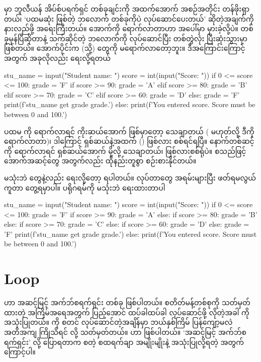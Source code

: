   မှာ ဘူလီယန် အိပ်စ်ပရက်ရှင် တစ်ခုချင်းကို အထက်အောက် အစဉ်အတိုင်း တန်ဖိုးရှာတယ်၊ ‘ပထမဆုံး   ဖြစ်တဲ့ ဘလောက် တစ်ခုကိုပဲ လုပ်ဆောင်ပေးတယ်’ ဆိုတဲ့အချက်ကို နားလည်ဖို့ အရေးကြီးတယ်။ အောက်ကို ရောက်လာတာဟာ အပေါ်မှာ မှားခဲ့လို့ပဲ။ တစ်ခုမှန်ပြီဆိုတာနဲ့ သက်ဆိုင်တဲ့ ဘလောက်ကို လုပ်ဆောင်ပြီး   တစ်တွဲလုံး ပြီးဆုံးသွားမှာ ဖြစ်တယ်။ အောက်ပိုင်းက  (သို့)  တွေကို မရောက်လာတော့ဘူး။ ဒီအကြောင်းကြောင့်  အတွက် အခုလိုလည်း ရေးလို့ရတယ်

%
\begin{py}
stu_name = input("Student name: ")
score = int(input("Score: "))
if 0 <= score <= 100:
    grade = 'F'
    if score >= 90:
        grade = 'A'
    elif score >= 80:
        grade = 'B'
    elif score >= 70:
        grade = 'C'
    elif score >= 60:
        grade = 'D'
    else:
        grade = 'F'
    print(f'{stu_name} get grade {grade}.')
else:
    print(f'You entered {score}. Score must be between 0 and 100.')
\end{py}
%
ပထမ  ကို ရောက်လာရင် ကိုးဆယ်အောက် ဖြစ်မှာတော့ သေချာတယ် ( မဟုတ်လို့ ဒီကို ရောက်လာတာ)၊  ဒါကြောင့် ရှစ်ဆယ်နဲ့အထက် () ဖြစ်လား စစ်ရင်ရပြီ။ နောက်တစ်ဆင့်ကို ရောက်လာရင် ရှစ်ဆယ်အောက် မို့လို့ သေချာတယ်၊  ဖြစ်လားစစ်ရုံပဲ။  စသည်ဖြင့် အောက်အဆင့်တွေ အတွက်လည်း ထိုနည်းတူစွာ စဉ်းစားနိုင်တယ်။


  မသုံးဘဲ  တွေနဲ့လည်း ရေးလို့တော့ ရပါတယ်။  လုပ်တာတွေ အရမ်းများပြီး ဖတ်ရမလွယ်ကူတာ တွေ့ရမှာပါ။  ပရိုဂရမ်ကို   မသုံးဘဲ ရေးထားတာပါ
%
\begin{py}
stu_name = input("Student name: ")
score = int(input("Score: "))
if 0 <= score <= 100:
    grade = 'F'
    if score >= 90:
        grade = 'A'
    else:
        if score >= 80:
            grade = 'B'
        else:
            if score >= 70:
                grade = 'C'
            else:
                if score >= 60:
                    grade = 'D'
                else:
                    grade = 'F'
    print(f'{stu_name} get grade {grade}.')
else:
    print(f'You entered {score}. Score must be between 0 and 100.')
\end{py}
%

\section{ Loop} %
   ဟာ အဆင့်မြင့် အက်ဘ်စရက်ရှင်း တစ်ခု ဖြစ်ပါတယ်။ စတိတ်မန့်တစ်စုကို သတ်မှတ်ထားတဲ့ အကြိမ်အရေအတွက် ပြည့်အောင် ထပ်ခါထပ်ခါ လုပ်ဆောင်ဖို့ လိုတဲ့အခါ   ကို အသုံးပြုတယ်။  ကို စတင် လုပ်ဆောင်တဲ့အချိန်မှာ ဘယ်နှစ်ကြိမ် ပြန်ကျော့မလဲ အတိအကျ ကြိုသိရင်   လို့ သတ်မှတ်တယ်။   ဟာ  ဖြစ်ပါတယ်။ ‘အဆင့်မြင့် အက်ဘ်စရက်ရှင်း’ လို့ ပြောရတာက  စတဲ့ စထရက်ချာ အမျိုးမျိုးနဲ့ အသုံးပြုလို့ရတဲ့ အတွက်ကြောင့်ပါ။ 

